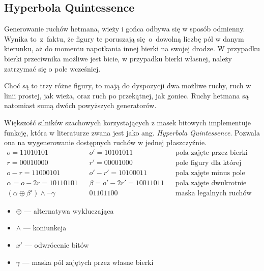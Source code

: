 \subsection{Hyperbola Quintessence}
\label{subsec:hyperbola-quintessence}

Generowanie ruchów hetmana, wieży i gońca odbywa się w sposób odmienny.
Wynika to~z~faktu, że figury te poruszają się~o~dowolną liczbę pól w danym kierunku, aż do momentu napotkania innej bierki na swojej drodze.
W przypadku bierki przeciwnika możliwe jest bicie, w przypadku bierki własnej, należy zatrzymać się o pole wcześniej.

Choć są to trzy różne figury, to mają do dyspozycji dwa możliwe ruchy, ruch w linii prostej, jak wieża, oraz ruch po przekątnej, jak goniec.
Ruchy hetmana są natomiast sumą dwóch powyższych generatorów.

Większość silników szachowych korzystających z masek bitowych implementuje funkcję, która w literaturze zwana jest jako ang. \emph{Hyperbola Quintessence}.
Pozwala ona na wygenerowanie dostępnych ruchów w jednej płaszczyźnie.
\begin{align*}
    o = \text{11010101} && o' = \text{10101011} && \text{pola zajęte przez bierki} \\
    r = \text{00010000} && r' = \text{00001000} && \text{pole figury dla której generujemy ruchy} \\
    o-r = \text{11000101} && o'-r' = \text{10100011} && \text{pola zajęte minus pole figury} \\
    \alpha = o-2r = \text{10110101} && \beta = o'-2r' = \text{10011011} && \text{pola zajęte dwukrotnie minus pole figury} \\
    (\alpha \oplus \beta') \wedge \neg \gamma && \text{01101100} && \text{maska legalnych ruchów}
\end{align*}
\begin{multicols}{2}
    \begin{itemize}[label={}]
        \item \(\oplus\) — alternatywa wykluczająca
        \item \(\wedge\) — koniunkcja
        \item \(x'\) — odwrócenie bitów
        \item \(\gamma\) — maska pól zajętych przez własne bierki
    \end{itemize}
\end{multicols}



